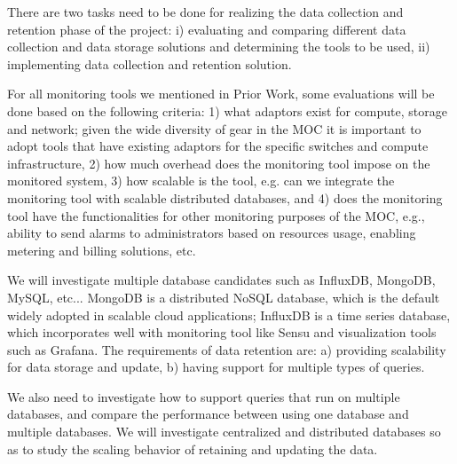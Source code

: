 There are two tasks need to be done for realizing the data collection and retention phase of the project: i) evaluating and comparing different data collection and data storage solutions and determining the tools to be used, ii) implementing data collection and retention solution. 

For all monitoring tools we mentioned in Prior Work, some evaluations will be done based on the following criteria: 1) what adaptors exist for compute, storage and network; given the wide diversity of gear in the MOC it is important to adopt tools that have existing adaptors for the specific switches and compute infrastructure, 2) how much overhead does the monitoring tool impose on the monitored system, 3) how scalable is the tool, e.g. can we integrate the monitoring tool with scalable distributed databases, and 4) does the monitoring tool have the functionalities for other monitoring purposes of the MOC, e.g., ability to send alarms to administrators based on resources usage, enabling metering and billing solutions, etc.

We will investigate multiple database candidates such as InfluxDB, MongoDB, MySQL, etc... MongoDB is a distributed NoSQL database, which is the default widely adopted in scalable cloud applications; InfluxDB is a time series database, which incorporates well with monitoring tool like Sensu and visualization tools such as Grafana. The requirements of data retention are: a) providing scalability for data storage and update, b) having support for multiple types of queries.

We also need to investigate how to support queries that run on multiple databases, and compare the performance between using one database and multiple databases. We will investigate centralized and distributed databases so as to study the scaling behavior of retaining and updating the data.

